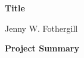 
%
%
%
%
%
%

\begin{center}
\large{\textbf{Title}} %
\end{center}
\begin{center}
    Jenny W. Fothergill
\end{center}
\begin{center}
    \textbf{Project Summary}
\end{center}

%

